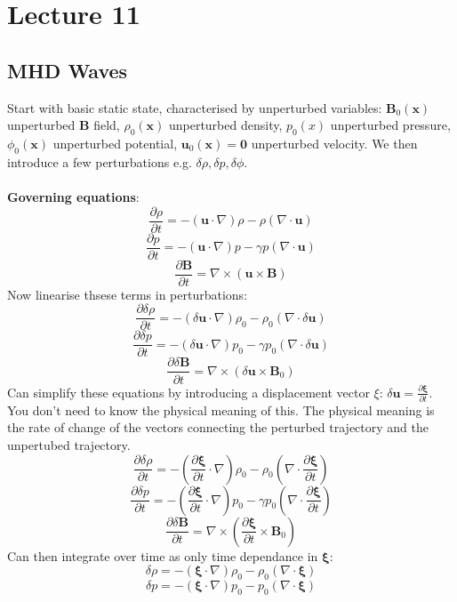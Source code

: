 \documentclass{article}
\begin{document}
\section{Lecture 11}
\subsection{MHD Waves}
Start with basic static state, characterised by unperturbed variables: $\bm B_0(\bm x)$ unperturbed $\bm B$ field, $\rho_0(\bm x)$ unperturbed density, $p_0(x)$ unperturbed pressure, $\phi_0(\bm x)$ unperturbed potential, $\bm u_0(\bm x) = \bm 0$ unperturbed velocity. We then introduce a few perturbations e.g. $\delta \rho, \delta p, \delta \phi$.\\\\
\textbf{Governing equations}:
$$
\frac{\partial \rho}{\partial t} = -(\bm u\cdot \nabla )\rho - \rho(\nabla \cdot \bm u)
$$
$$
\frac{\partial p}{\partial t} = -(\bm u\cdot \nabla )p - \gamma p(\nabla \cdot \bm u)
$$
$$
\frac{\partial \bm B}{\partial t} = \nabla \times(\bm u \times \bm B)
$$
Now linearise thsese terms in perturbations:
$$
\frac{\partial \delta \rho}{\partial t} = -(\delta \bm u\cdot \nabla )\rho_0 - \rho_0(\nabla \cdot \delta \bm u)
$$
$$
\frac{\partial \delta p}{\partial t} = -(\delta \bm u\cdot \nabla )p_0 - \gamma p_0(\nabla \cdot \delta \bm u)
$$
$$
\frac{\partial \delta \bm B}{\partial t} = \nabla \times(\delta \bm u \times \bm B_0)
$$
Can simplify these equations by introducing a displacement vector $\xi$: $\delta \bm u = \frac{\partial \bm \xi}{\partial t}$. You don't need to know the physical meaning of this. The physical meaning is the rate of change of the vectors connecting the perturbed trajectory and the unpertubed trajectory.
$$
\frac{\partial \delta \rho}{\partial t} = -(\frac{\partial \bm \xi}{\partial t}\cdot \nabla )\rho_0 - \rho_0(\nabla \cdot\frac{\partial \bm \xi}{\partial t}) 
$$
$$
\frac{\partial \delta p}{\partial t} = -(\frac{\partial \bm \xi}{\partial t}\cdot \nabla )p_0 - \gamma p_0(\nabla \cdot\frac{\partial \bm \xi}{\partial t} )
$$
$$
\frac{\partial \delta \bm B}{\partial t} = \nabla \times(\frac{\partial \bm \xi}{\partial t}\times \bm B_0)
$$
Can then integrate over time as only time dependance in $\bm \xi$:
\begin{equation}
\delta \rho = -( \bm \xi\cdot \nabla )\rho_0 - \rho_0(\nabla \cdot\bm \xi) 
\end{equation}
\begin{equation}
\delta p = -( \bm \xi\cdot \nabla )p_0 - p_0(\nabla \cdot\bm \xi) 
\end{equation}
\end{document}
